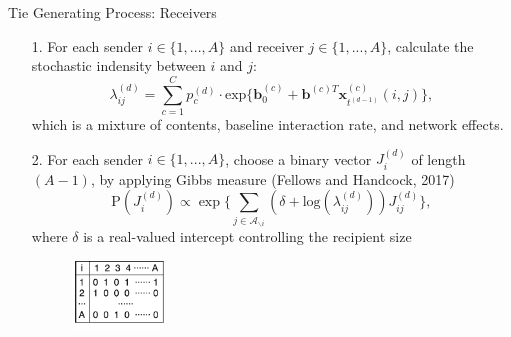 \documentclass[10pt]{beamer}
\theoremstyle{definition}
\theoremstyle{remark}
\begin{document}
\begin{frame}{Tie Generating Process: Receivers}
		\begin{itemize}
		\item [1.] For each sender $i \in \{1,...,A\}$ and receiver $j \in \{1,...,A\}$, calculate the stochastic indensity between $i$ and $j$:
		\footnotesize
			\begin{equation*}\lambda^{(d)}_{ij}=\sum\limits_{c=1}^{C} p^{(d)}_c
		\cdot  \mbox{exp}\Big\{\boldsymbol{b}^{(c)}_0 + \boldsymbol{b}^{(c)T}\boldsymbol{x}^{(c)}_{t^{(d-1)}}(i, j)\Big\},	\end{equation*}\normalsize
		which is a mixture of contents, baseline interaction rate, and network effects.\\ \vspace{0.4cm}
		\item[2.] For each sender $i \in \{1,...,A\}$, choose a binary vector $J^{(d)}_i$ of length $(A-1)$, by applying Gibbs measure (Fellows and Handcock, 2017) 
		\footnotesize
		\begin{equation*} \text{P}(J_i^{(d)}) \propto \exp\Big\{ \sum_{j \in \mathcal{A}_{\backslash i}} (\delta+\mbox{log}(\lambda_{ij}^{(d)}))J_{ij}^{(d)} \Big\},
		\end{equation*}
		\normalsize
		where $\delta$ is a real-valued intercept controlling the recipient size\\ \vspace{0.1cm}
 \begin{figure}
 	\includegraphics[width=0.23\textwidth]{figures/table.pdf}
 \end{figure}	
	\end{itemize}
	\end{frame}
\end{document}
